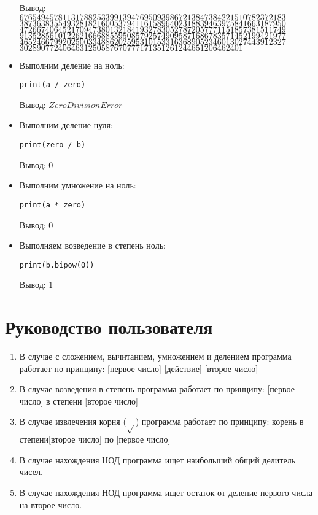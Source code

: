 \begin{itemize}
        Вывод:\\
        $67654945781131788253399139476950939867213847384221510782372183$
        $38736383554932818216005379411615896402318839463975841663187950$
        $47266740645217094738013218419327830527872057771151857381511749$
        $91352856101226216668855950857925749095871686783571452199421977$
        $46524667992025003348862025953101533163689052346013027443912327$
        $3028907724064631250587670777171351261244651206462401$
        \item Выполним деление на ноль:
        \begin{lstlisting}
print(a / zero)\end{lstlisting}
        Вывод: $ZeroDivisionError$
        \item Выполним деление нуля:
        \begin{lstlisting}
print(zero / b)\end{lstlisting}
        Вывод: $0$
        \item Выполним умножение на ноль:
        \begin{lstlisting}
print(a * zero)\end{lstlisting}
        Вывод: $0$
        \item Выполняем возведение в степень ноль:
        \begin{lstlisting}
print(b.bipow(0))\end{lstlisting}
        Вывод: $1$
    \end{itemize}


\clearpage
\section{Руководство пользователя}
    \begin{enumerate}
        \item В случае с сложением, вычитанием, умножением и делением программа работает по принципу:
        [первое число] [действие] [второе число]
        \item В случае возведения в степень программа работает по принципу:
        [первое число] в степени [второе число]
        \item В случае извлечения корня ($\sqrt{}$) программа работает по принципу:
        корень в степени[второе число] по [первое число]
        \item В случае нахождения НОД программа ищет наибольший общий делитель чисел.
        \item В случае нахождения НОД программа ищет остаток от деление первого числа на второе число.
    \end{enumerate}


